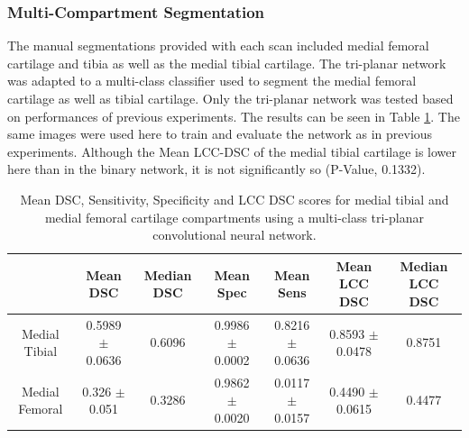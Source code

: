 \documentclass[11pt,a4paper]{memoir}
\numberwithin{figure}{section}
\numberwithin{table}{section}
\numberwithin{equation}{section}
\begin{document}
\subsubsection{Multi-Compartment Segmentation}
The manual segmentations provided with each scan included medial femoral cartilage and tibia as well as the medial tibial cartilage. The tri-planar network was adapted to a multi-class classifier used to segment the medial femoral cartilage as well as tibial cartilage. Only the tri-planar network was tested based on performances of previous experiments. The results can be seen in Table \ref{compz}. The same images were used here to train and evaluate the network as in previous experiments. Although the Mean LCC-DSC of the medial tibial cartilage is lower here than in the binary network, it is not significantly so (P-Value, 0.1332).\\

\begin{landscape}

\begin{table}[!ht]
\vspace{4cm}
\centering\caption[Segmentation accuracy for a multi-class convolutional neural network]{Mean DSC, Sensitivity, Specificity and LCC DSC scores for medial tibial and medial femoral cartilage compartments using a multi-class tri-planar convolutional neural network. }
\begin{tabular}{|c|c|c|c|c|c|c|}
           \hline     & Mean DSC & Median DSC & Mean Spec & Mean Sens & Mean LCC DSC & Median LCC DSC \\  \hline
Medial Tibial  & 0.5989 $\pm$ 0.0636 & 0.6096 & 0.9986  $\pm$ 0.0002   &   0.8216  $\pm$ 0.0636 & 0.8593  $\pm$ 0.0478     & 0.8751         \\  \hline
Medial Femoral & 0.326 $\pm$ 0.051  & 0.3286  &   0.9862  $\pm$  0.0020  &    0.0117  $\pm$ 0.0157  & 0.4490  $\pm$ 0.0615     & 0.4477       \\ \hline
\end{tabular}

\label{compz}
\end{table}
\end{landscape}
\end{document}

